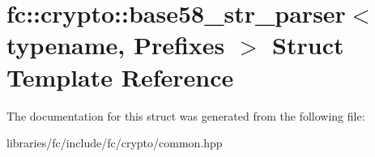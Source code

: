 \hypertarget{structfc_1_1crypto_1_1base58__str__parser}{}\section{fc\+:\+:crypto\+:\+:base58\+\_\+str\+\_\+parser$<$ typename, Prefixes $>$ Struct Template Reference}
\label{structfc_1_1crypto_1_1base58__str__parser}


The documentation for this struct was generated from the following file\+:\begin{DoxyCompactItemize}
\item 
libraries/fc/include/fc/crypto/common.\+hpp\end{DoxyCompactItemize}
